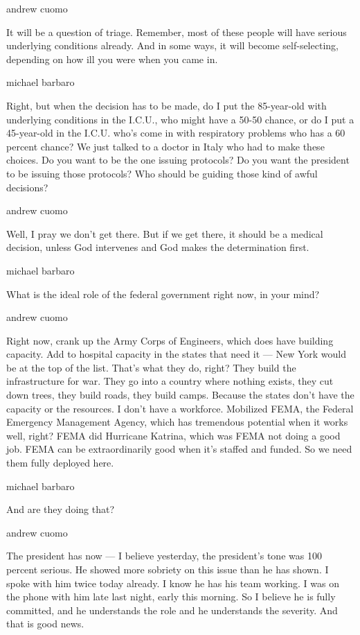 andrew cuomo

It will be a question of triage. Remember, most of these people will
have serious underlying conditions already. And in some ways, it will
become self-selecting, depending on how ill you were when you came in.

michael barbaro

Right, but when the decision has to be made, do I put the 85-year-old
with underlying conditions in the I.C.U., who might have a 50-50 chance,
or do I put a 45-year-old in the I.C.U. who's come in with respiratory
problems who has a 60 percent chance? We just talked to a doctor in
Italy who had to make these choices. Do you want to be the one issuing
protocols? Do you want the president to be issuing those protocols? Who
should be guiding those kind of awful decisions?

andrew cuomo

Well, I pray we don't get there. But if we get there, it should be a
medical decision, unless God intervenes and God makes the determination
first.

michael barbaro

What is the ideal role of the federal government right now, in your
mind?

andrew cuomo

Right now, crank up the Army Corps of Engineers, which does have
building capacity. Add to hospital capacity in the states that need it
--- New York would be at the top of the list. That's what they do,
right? They build the infrastructure for war. They go into a country
where nothing exists, they cut down trees, they build roads, they build
camps. Because the states don't have the capacity or the resources. I
don't have a workforce. Mobilized FEMA, the Federal Emergency Management
Agency, which has tremendous potential when it works well, right? FEMA
did Hurricane Katrina, which was FEMA not doing a good job. FEMA can be
extraordinarily good when it's staffed and funded. So we need them fully
deployed here.

michael barbaro

And are they doing that?

andrew cuomo

The president has now --- I believe yesterday, the president's tone was
100 percent serious. He showed more sobriety on this issue than he has
shown. I spoke with him twice today already. I know he has his team
working. I was on the phone with him late last night, early this
morning. So I believe he is fully committed, and he understands the role
and he understands the severity. And that is good news.

